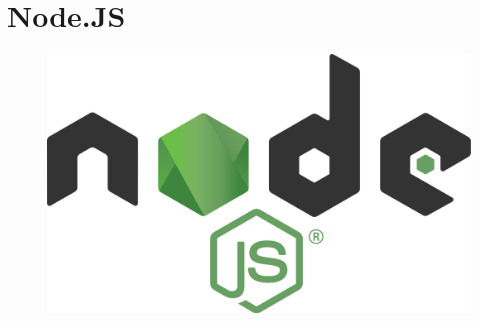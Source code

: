 \chapter{Node.JS}

\lipsum[1]
\begin{figure}
	\includegraphics[width=0.19\paperwidth]{./img/node}
\end{figure}
\lipsum[1]